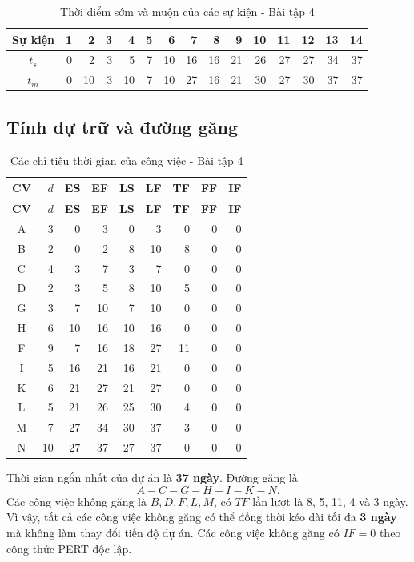 \begin{table}[H]\centering
\caption{Thời điểm sớm và muộn của các sự kiện - Bài tập 4}
\begin{tabular}{c|rrrrrrrrrrrrrr}
\toprule
Sự kiện&1&2&3&4&5&6&7&8&9&10&11&12&13&14\\
\midrule
$t_s$&0&2&3&5&7&10&16&16&21&26&27&27&34&37\\
$t_m$&0&10&3&10&7&10&27&16&21&30&27&30&37&37\\
\bottomrule
\end{tabular}
\end{table}

\subsection{Tính dự trữ và đường găng}

\begin{longtable}{c|r|rr|rr|rrr}
\caption{Các chỉ tiêu thời gian của công việc - Bài tập 4}\\
\toprule
\textbf{CV}&\textbf{$d$}&\textbf{ES}&\textbf{EF}&\textbf{LS}&\textbf{LF}&\textbf{TF}&\textbf{FF}&\textbf{IF}\\
\midrule
\endfirsthead
\toprule
\textbf{CV}&\textbf{$d$}&\textbf{ES}&\textbf{EF}&\textbf{LS}&\textbf{LF}&\textbf{TF}&\textbf{FF}&\textbf{IF}\\
\midrule
\endhead
A&3&0&3&0&3&0&0&0\\
B&2&0&2&8&10&8&0&0\\
C&4&3&7&3&7&0&0&0\\
D&2&3&5&8&10&5&0&0\\
G&3&7&10&7&10&0&0&0\\
H&6&10&16&10&16&0&0&0\\
F&9&7&16&18&27&11&0&0\\
I&5&16&21&16&21&0&0&0\\
K&6&21&27&21&27&0&0&0\\
L&5&21&26&25&30&4&0&0\\
M&7&27&34&30&37&3&0&0\\
N&10&27&37&27&37&0&0&0\\
\bottomrule
\end{longtable}

Thời gian ngắn nhất của dự án là \textbf{37 ngày}. Đường găng là
\[
  \boxed{A-C-G-H-I-K-N}.
\]
Các công việc không găng là $B,D,F,L,M$, có $TF$ lần lượt là 8, 5, 11,
4 và 3 ngày. Vì vậy, tất cả các công việc không găng có thể đồng thời kéo
dài tối đa \textbf{3 ngày} mà không làm thay đổi tiến độ dự án. Các công việc
không găng có $IF=0$ theo công thức PERT độc lập.

